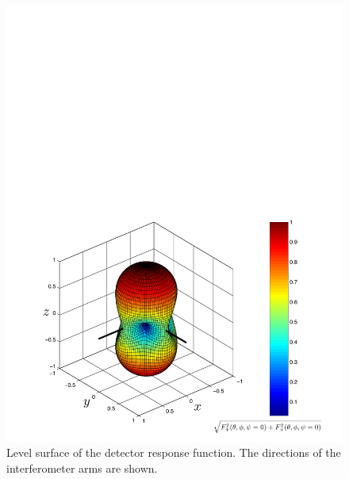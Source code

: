 \begin{figure}[p]
\begin{center}
\includegraphics[width=\linewidth]{figures/inspiral/beampattern}
\end{center}
\caption[Antenna Response of an Interferometer]{%
\label{f:beampattern}
Level surface of the detector response function. The directions of the
interferometer arms are shown.
}
\end{figure}
